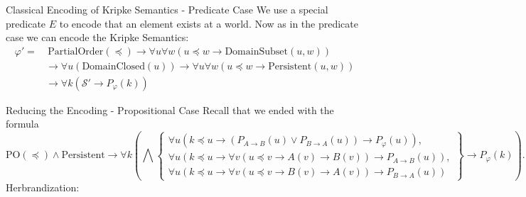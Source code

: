 \documentclass{cubeamer}
\begin{document}
	\begin{frame}{Classical Encoding of Kripke Semantics - Predicate Case}
		We use a special predicate $E$ to encode that an element exists at a world.
		Now as in the predicate case we can encode the Kripke Semantics:
		\begin{align*}
			\varphi'= &\:\text{PartialOrder}(\preceq) \to \forall u \forall w (u\preceq w\to \text{DomainSubset}(u, w))\\
			&\to\forall u(\text{DomainClosed}(u))\to \forall u\forall w (u\preceq w\to \text{Persistent}(u, w))\\
			&\to \forall k(\mathcal S'\to P_\varphi(k))
		\end{align*}
	\end{frame}
	
	\begin{frame}{Reducing the Encoding - Propositional Case}
		Recall that we ended with the formula
		$$\text{PO}(\preceq)\wedge\text{Persistent}\to \forall k\left(\bigwedge\left\{\substack{\forall u(k\preceq u\to (P_{A\to B}(u)\vee P_{B\to A}(u))\to P_\varphi(u)),\\ \forall u(k\preceq u\to \forall v(u\preceq v\to A(v)\to B(v))\to P_{A\to B}(u)),\\\forall u(k\preceq u\to \forall v(u\preceq v\to B(v)\to A(v))\to P_{B\to A}(u))}\right\} \to P_\varphi(k)\right).$$
		Herbrandization:
		\[\phantom{\text{PO}(\preceq)\wedge\text{Persistent}\to \bigwedge\left\{\substack{\forall u({\color{red}s}\preceq u\to (P_{A\to B}(u)\vee P_{B\to A}(u))\to P_\varphi(u)),\\ \forall u({\color{red}s}\preceq u\to (u\preceq {\color{red}f_{A\to B}(u)}\to A({\color{red}f_{A\to B}(u)})\to B({\color{red}f_{A\to B}(u)}))\to P_{A\to B}(u)),\\\forall u({\color{red}s}\preceq u\to (u\preceq  {\color{red}f_{B\to A}(u)}\to B({\color{red}f_{B\to A}(u)})\to A({\color{red}f_{B\to A}(u)}))\to P_{B\to A}(u))}\right\} \to P_\varphi({\color{red}s}).}\]
	\end{frame}
	
\end{document}
